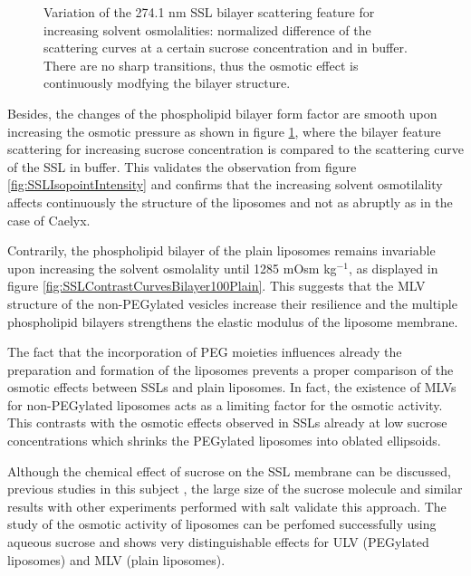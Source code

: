 \begin{figure}
	\centering
		
		\caption{Variation of the 274.1 nm SSL bilayer scattering feature for increasing solvent osmolalities: normalized difference of the scattering curves at a certain sucrose concentration and in buffer. There are no sharp transitions, thus the osmotic effect is continuously modfying the bilayer structure.}
		\label{fig:SSLContrastVariationChiSquared400SSL}
\end{figure}

Besides, the changes of the phospholipid bilayer form factor are smooth upon increasing the osmotic pressure as shown in figure \ref{fig:SSLContrastVariationChiSquared400SSL}, where the bilayer feature scattering for increasing sucrose concentration is compared to the scattering curve of the SSL in buffer. This validates the observation from figure \ref{fig:SSLIsopointIntensity} and confirms that the increasing solvent osmotilality affects continuously the structure of the liposomes and not as abruptly as in the case of Caelyx.

Contrarily, the phospholipid bilayer of the plain liposomes remains invariable upon increasing the solvent osmolality until 1285 mOsm kg$^{-1}$, as displayed in figure \ref{fig:SSLContrastCurvesBilayer100Plain}. This suggests that the MLV structure of the non-PEGylated vesicles increase their resilience and the multiple phospholipid bilayers strengthens the elastic modulus of the liposome membrane.

The fact that the incorporation of PEG moieties influences already the preparation and formation of the liposomes prevents a proper comparison of the osmotic effects between SSLs and plain liposomes. In fact, the existence of MLVs for non-PEGylated liposomes acts as a limiting factor for the osmotic activity. This contrasts with the osmotic effects observed in SSLs already at low sucrose concentrations which shrinks the PEGylated liposomes into oblated ellipsoids. 

Although the chemical effect of sucrose on the SSL membrane can be discussed, previous studies in this subject \cite{kiselev_does_2003, kiselev_sucrose_2001, kiselev_sucrose_2001-1}, the large size of the sucrose molecule and similar results with other experiments performed with salt \cite{varga_osmotic_2014} validate this approach. The study of the osmotic activity of liposomes can be perfomed successfully using aqueous sucrose and shows very distinguishable effects for ULV (PEGylated liposomes) and MLV (plain liposomes).

